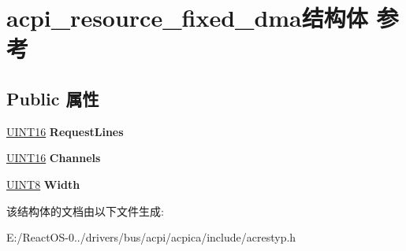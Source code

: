 \hypertarget{structacpi__resource__fixed__dma}{}\section{acpi\+\_\+resource\+\_\+fixed\+\_\+dma结构体 参考}
\label{structacpi__resource__fixed__dma}
\subsection*{Public 属性}
\begin{DoxyCompactItemize}
\item 
\mbox{\label{structacpi__resource__fixed__dma_ae767c40b88cfe37d9f092731bd6e7022}} 
\hyperlink{_processor_bind_8h_a09f1a1fb2293e33483cc8d44aefb1eb1}{U\+I\+N\+T16} {\bfseries Request\+Lines}
\item 
\mbox{\label{structacpi__resource__fixed__dma_ae18f4657073c7f507865eab9770acf3a}} 
\hyperlink{_processor_bind_8h_a09f1a1fb2293e33483cc8d44aefb1eb1}{U\+I\+N\+T16} {\bfseries Channels}
\item 
\mbox{\label{structacpi__resource__fixed__dma_a27a96ba246e721c9fab86745381cfef6}} 
\hyperlink{_processor_bind_8h_ab27e9918b538ce9d8ca692479b375b6a}{U\+I\+N\+T8} {\bfseries Width}
\end{DoxyCompactItemize}


该结构体的文档由以下文件生成\+:\begin{DoxyCompactItemize}
\item 
E\+:/\+React\+O\+S-\/0../drivers/bus/acpi/acpica/include/acrestyp.\+h\end{DoxyCompactItemize}
